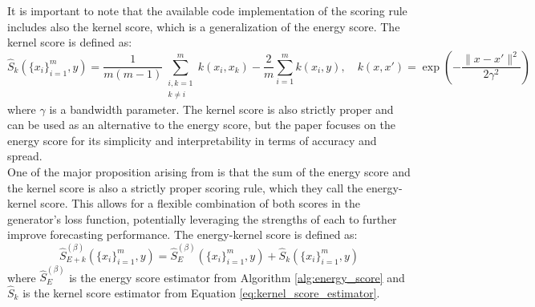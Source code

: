 It is important to note that the available code implementation of the scoring rule includes also the 
kernel score, which is a generalization of the energy score. The kernel score is defined as:
\begin{equation}
    \label{eq:kernel_score_estimator}
    \hat{S}_k(\{x_i\}_{i=1}^m, y) = 
    \frac{1}{m(m-1)}\sum_{\substack{i,k=1 \\ k \neq i}}^m k(x_i, x_k) 
    - \frac{2}{m}\sum_{i=1}^m k(x_i, y), 
    \quad k(x,x') = \exp\!\left(-\frac{\|x - x'\|^2}{2\gamma^2}\right)
\end{equation}
where $\gamma$ is a bandwidth parameter. The kernel score is also strictly proper and can be used as an alternative to the energy score, but the paper focuses on the energy score for its simplicity and interpretability in terms of accuracy and spread.\\
One of the major proposition arising from \cite{srforgan:srforgan} is that the sum of the energy score and the kernel score is also a strictly proper scoring rule, which they call the energy-kernel score. This allows for a flexible combination of both scores in the generator's loss function, potentially leveraging the strengths of each to further improve forecasting performance.
The energy-kernel score is defined as:
\begin{equation}
    \label{eq:energy_kernel_score_estimator}
    \hat{S}_{E+k}^{(\beta)}(\{x_i\}_{i=1}^m, y) = 
    \hat{S}_E^{(\beta)}(\{x_i\}_{i=1}^m, y) 
    + \hat{S}_k(\{x_i\}_{i=1}^m, y)
\end{equation}
where $\hat{S}_E^{(\beta)}$ is the energy score estimator from Algorithm \ref{alg:energy_score} and $\hat{S}_k$ is the kernel score estimator from Equation \ref{eq:kernel_score_estimator}.


